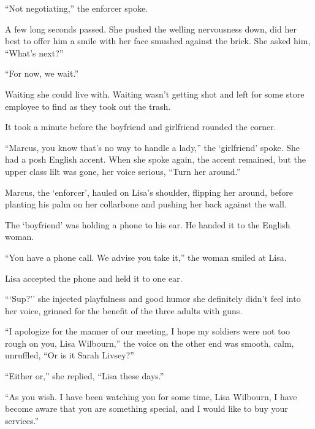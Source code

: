 ``Not negotiating,'' the enforcer spoke.



A few long seconds passed.  She pushed the welling nervousness down, did her best to offer him a smile with her face smushed against the brick.  She asked him, ``What's next?''



``For now, we wait.''



Waiting she could live with.  Waiting wasn't getting shot and left for some store employee to find as they took out the trash.



It took a minute before the boyfriend and girlfriend rounded the corner.



``Marcus, you know that's no way to handle a lady,'' the `girlfriend' spoke.  She had a posh English accent.  When she spoke again, the accent remained, but the upper class lilt was gone, her voice serious, ``Turn her around.''



Marcus, the `enforcer', hauled on Lisa's shoulder, flipping her around, before planting his palm on her collarbone and pushing her back against the wall.



The `boyfriend' was holding a phone to his ear.  He handed it to the English woman.



``You have a phone call.  We advise you take it,'' the woman smiled at Lisa.



Lisa accepted the phone and held it to one ear.



```Sup?'' she injected playfulness and good humor she definitely didn't feel into her voice, grinned for the benefit of the three adults with guns.



``I apologize for the manner of our meeting, I hope my soldiers were not too rough on you, Lisa Wilbourn,'' the voice on the other end was smooth, calm, unruffled, ``Or is it Sarah Livsey?''



``Either or,'' she replied,  ``Lisa these days.''



``As you wish.  I have been watching you for some time, Lisa Wilbourn, I have become aware that you are something special, and I would like to buy your services.''



